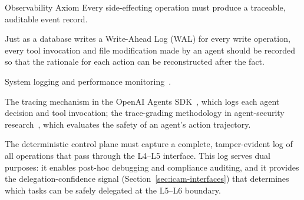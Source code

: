 \begin{axiombox}{\theaxiom\enspace Observability Axiom}
Every side-effecting operation must produce a traceable, auditable event record.
\end{axiombox}
\begin{description}[style=nextline,leftmargin=2em,font=\bfseries]
\item[Intuition.] Just as a database writes a Write-Ahead Log (WAL) for every write operation, every tool invocation and file modification made by an agent should be recorded so that the rationale for each action can be reconstructed after the fact.
\item[Classical source.] System logging and performance monitoring~\cite{linux_cgroup_2026}.
\item[ICA embodiment.] The tracing mechanism in the OpenAI Agents SDK~\cite{openai_codex_agentsdk_2026}, which logs each agent decision and tool invocation; the trace-grading methodology in agent-security research~\cite{agenticsecurity2025}, which evaluates the safety of an agent's action trajectory.
\item[Design implication.] The deterministic control plane must capture a complete, tamper-evident log of all operations that pass through the L4--L5 interface. This log serves dual purposes: it enables post-hoc debugging and compliance auditing, and it provides the delegation-confidence signal (Section~\ref{sec:icam-interfaces}) that determines which tasks can be safely delegated at the L5--L6 boundary.
\end{description}
